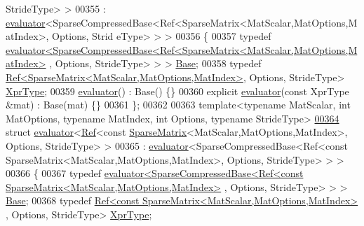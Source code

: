 \begin{DoxyCode}
      StrideType> >
00355   : \hyperlink{struct_eigen_1_1internal_1_1evaluator}{evaluator}<SparseCompressedBase<Ref<SparseMatrix<MatScalar,MatOptions,MatIndex>, Options, Strid
      eType> > >
00356 \{
00357   \textcolor{keyword}{typedef} 
      \hyperlink{struct_eigen_1_1internal_1_1evaluator}{evaluator<SparseCompressedBase<Ref<SparseMatrix<MatScalar,MatOptions,MatIndex>}
      , Options, StrideType> > > \hyperlink{struct_eigen_1_1internal_1_1evaluator}{Base};
00358   \textcolor{keyword}{typedef} \hyperlink{group___core___module_class_eigen_1_1_ref}{Ref<SparseMatrix<MatScalar,MatOptions,MatIndex>}, 
      Options, StrideType> \hyperlink{group___sparse_core___module_class_eigen_1_1_ref_3_01_sparse_matrix_3_01_mat_scalar_00_01_mat_options_00_01_mat_index_01_4_0024ec28acf7b4e76d8ff99a0bdc39c296}{XprType};  
00359   \hyperlink{struct_eigen_1_1internal_1_1evaluator}{evaluator}() : Base() \{\}
00360   \textcolor{keyword}{explicit} \hyperlink{struct_eigen_1_1internal_1_1evaluator}{evaluator}(\textcolor{keyword}{const} XprType &mat) : Base(mat) \{\}
00361 \};
00362 
00363 \textcolor{keyword}{template}<\textcolor{keyword}{typename} MatScalar, \textcolor{keywordtype}{int} MatOptions, \textcolor{keyword}{typename} MatIndex, \textcolor{keywordtype}{int} Options, \textcolor{keyword}{typename} Str\textcolor{keywordtype}{id}eType>
\hyperlink{struct_eigen_1_1internal_1_1evaluator_3_01_ref_3_01const_01_sparse_matrix_3_01_mat_scalar_00_01_17d98bf798af280639e961c8a27d545c}{00364} \textcolor{keyword}{struct }\hyperlink{struct_eigen_1_1internal_1_1evaluator}{evaluator}<\hyperlink{group___core___module_class_eigen_1_1_ref}{Ref}<const \hyperlink{group___sparse_core___module_class_eigen_1_1_sparse_matrix}{SparseMatrix}<MatScalar,MatOptions,MatIndex>, Options, 
      StrideType> >
00365   : \hyperlink{struct_eigen_1_1internal_1_1evaluator}{evaluator}<SparseCompressedBase<Ref<const SparseMatrix<MatScalar,MatOptions,MatIndex>, Options,
       StrideType> > >
00366 \{
00367   \textcolor{keyword}{typedef} 
      \hyperlink{struct_eigen_1_1internal_1_1evaluator}{evaluator<SparseCompressedBase<Ref<const SparseMatrix<MatScalar,MatOptions,MatIndex>}
      , Options, StrideType> > > \hyperlink{struct_eigen_1_1internal_1_1evaluator}{Base};
00368   \textcolor{keyword}{typedef} \hyperlink{group___core___module_class_eigen_1_1_ref}{Ref<const SparseMatrix<MatScalar,MatOptions,MatIndex>}
      , Options, StrideType> \hyperlink{class_eigen_1_1_ref_3_01const_01_sparse_matrix_3_01_mat_scalar_00_01_mat_options_00_01_mat_index1bbfd78857ba9c14d54178cb3009ac38}{XprType};  

\end{DoxyCode}
